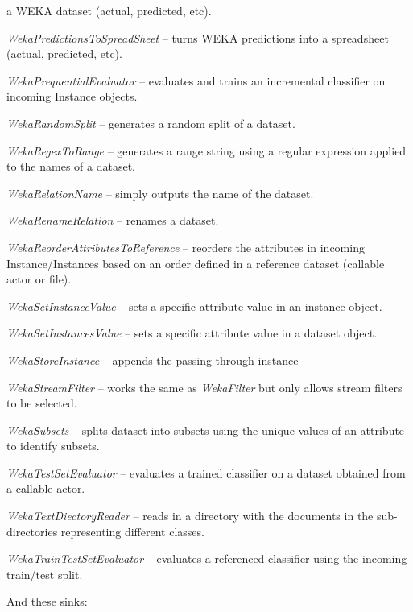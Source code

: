 \begin{tight_itemize}
	a WEKA dataset (actual, predicted, etc).
	\item \textit{WekaPredictionsToSpreadSheet} -- turns WEKA predictions into
	a spreadsheet (actual, predicted, etc).
	\item \textit{WekaPrequentialEvaluator} -- evaluates and trains an
	incremental classifier on incoming Instance objects.
	\item \textit{WekaRandomSplit} -- generates a random split of a dataset.
	\item \textit{WekaRegexToRange} -- generates a range string using a regular
	expression applied to the names of a dataset.
	\item \textit{WekaRelationName} -- simply outputs the name of the dataset.
	\item \textit{WekaRenameRelation} -- renames a dataset.
	\item \textit{WekaReorderAttributesToReference} -- reorders the attributes
	in incoming Instance/Instances based on an order defined in a reference
	dataset (callable actor or file).
	\item \textit{WekaSetInstanceValue} -- sets a specific attribute value in
	an instance object.
	\item \textit{WekaSetInstancesValue} -- sets a specific attribute value in
	a dataset object.
	\item \textit{WekaStoreInstance} -- appends the passing through instance 
	\item \textit{WekaStreamFilter} -- works the same as
	\textit{WekaFilter} but only allows stream filters to be selected.
	\item \textit{WekaSubsets} -- splits dataset into subsets using the unique
	values of an attribute to identify subsets.
	\item \textit{WekaTestSetEvaluator} -- evaluates a trained classifier on
	a dataset obtained from a callable actor.
	\item \textit{WekaTextDiectoryReader} -- reads in a directory with the 
	documents in the sub-directories representing different classes.
	\item \textit{WekaTrainTestSetEvaluator} -- evaluates a referenced classifier
	using the incoming train/test split.
\end{tight_itemize}
And these sinks:
